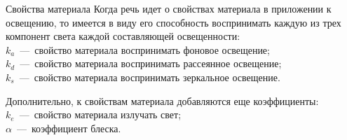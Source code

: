 \documentclass{beamer}
\begin{document}
	\begin{frame}{Свойства материала}
		Когда речь идет о свойствах материала в приложении к освещению, то имеется в виду его способность воспринимать каждую из трех компонент света каждой составляющей освещенности: \\
		$k_a$~---~свойство материала воспринимать фоновое освещение; \\
		$k_d$~---~свойство материала воспринимать рассеянное освещение; \\
		$k_s$~---~свойство материала воспринимать зеркальное освещение.
		
		\vspace{0.3cm}
		Дополнительно, к свойствам материала добавляются еще коэффициенты: \\
		$k_e$~---~свойство материала излучать свет; \\
		$\alpha$~---~коэффициент блеска. 
		
	\end{frame}
\end{document}
